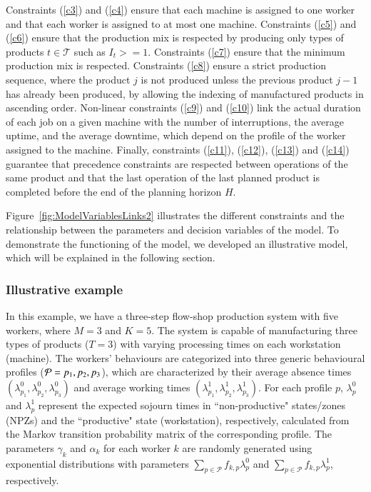 \documentclass[review,12pt, 3p, times]{elsarticle}
\begin{document}
	
Constraints (\ref{c3}) and (\ref{c4}) ensure that each machine is assigned to one worker and that each worker is assigned to at most one machine. 
Constraints (\ref{c5}) and (\ref{c6}) ensure that the production mix is respected by producing only types of products $t\in\mathcal{T}$ such as $I_t >= 1$.
Constraints (\ref{c7}) ensure that the minimum production mix is respected.
Constraints (\ref{c8}) ensure a strict production sequence, where the product $j$ is not produced unless the previous product $j-1$ has already been produced, by allowing the indexing of manufactured products in ascending order.
Non-linear constraints (\ref{c9}) and (\ref{c10}) link the actual duration of each job on a given machine with the number of interruptions, the average uptime, and the average downtime, which depend on the profile of the worker assigned to the machine.  
Finally, constraints (\ref{c11}), (\ref{c12}), (\ref{c13}) and (\ref{c14}) guarantee that precedence constraints are respected between operations of the same product and that the last operation of the last planned product is completed before the end of the planning horizon $H$.
	
Figure~\ref{fig:ModelVariablesLinks2} illustrates the different constraints and the relationship between the parameters and decision variables of the model. To demonstrate the functioning of the model, we developed an illustrative model, which will be explained in the following section.
					
			
					
\subsubsection{Illustrative example}
In this example, we have a three-step flow-shop production system with five workers, where $M=3$ and $K=5$. The system is capable of manufacturing three types of products ($T=3$) with varying processing times on each workstation (machine). The workers' behaviours are categorized into three generic behavioural profiles (${\cal P}={p_1,p_2,p_3}$), which are characterized by their average absence times $(\lambda^0_{p_1},\lambda^0_{p_2},\lambda^0_{p_3})$ and average working times $(\lambda^1_{p_1},\lambda^1_{p_2},\lambda^1_{p_3})$. For each profile $p$, $\lambda^0_{p}$ and $\lambda^1_{p}$ represent the expected sojourn times in “non-productive" states/zones (NPZs) and the “productive" state (workstation), respectively, calculated from the Markov transition probability matrix of the corresponding profile. The parameters $\gamma_k$ and $\alpha_k$ for each worker $k$ are randomly generated using exponential distributions with parameters $\sum_{p\in\mathcal{P}}f_{k,p}\lambda^0_p$ and $\sum_{p\in\mathcal{P}}f_{k,p}\lambda^1_p$, respectively.  
					
\end{document}
